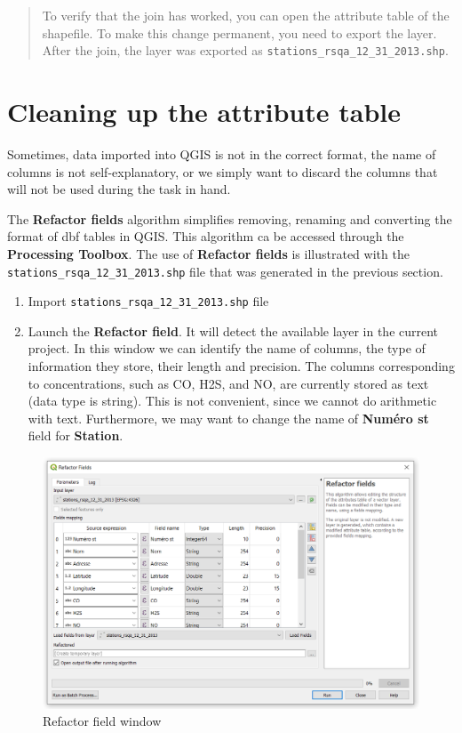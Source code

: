 \documentclass[]{book}
\providecommand{\tightlist}{%
  \setlength{\itemsep}{0pt}\setlength{\parskip}{0pt}}
\theoremstyle{definition}
\theoremstyle{definition}
\theoremstyle{definition}
\theoremstyle{remark}
\begin{document}
\begin{quote}
To verify that the join has worked, you can open the attribute table of
the shapefile. To make this change permanent, you need to export the
layer. After the join, the layer was exported as
\texttt{stations\_rsqa\_12\_31\_2013.shp}.
\end{quote}

\section{Cleaning up the attribute
table}\label{cleaning-up-the-attribute-table}

Sometimes, data imported into QGIS is not in the correct format, the
name of columns is not self-explanatory, or we simply want to discard
the columns that will not be used during the task in hand.

The \textbf{Refactor fields} algorithm simplifies removing, renaming and
converting the format of dbf tables in QGIS. This algorithm ca be
accessed through the \textbf{Processing Toolbox}. The use of
\textbf{Refactor fields} is illustrated with the
\texttt{stations\_rsqa\_12\_31\_2013.shp} file that was generated in the
previous section.

\begin{enumerate}
\def\labelenumi{\arabic{enumi}.}
\tightlist
\item
  Import \texttt{stations\_rsqa\_12\_31\_2013.shp} file
\item
  Launch the \textbf{Refactor field}. It will detect the available layer
  in the current project. In this window we can identify the name of
  columns, the type of information they store, their length and
  precision. The columns corresponding to concentrations, such as CO,
  H2S, and NO, are currently stored as text (data type is string). This
  is not convenient, since we cannot do arithmetic with text.
  Furthermore, we may want to change the name of \textbf{Numéro st}
  field for \textbf{Station}.
\end{enumerate}

\begin{figure}

{\centering \includegraphics[width=15.72in]{figures/Refactor_Dialog} 

}

\caption{Refactor field window}\label{fig:unnamed-chunk-16}
\end{figure}
\end{document}
